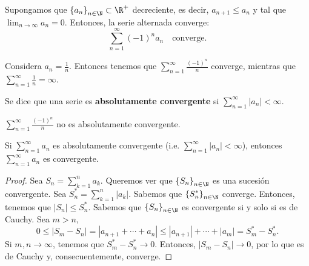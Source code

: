 \begin{ftheorem}
	\normalfont Supongamos que $\displaystyle \left\{ a_{n}\right\} _{n\in\N}\subset\R^{+} $ decreciente, es decir, $\displaystyle a_{n+1} \leq a_{n} $ y tal que $\displaystyle \lim_{n \to \infty}a_{n} = 0 $. Entonces, la serie alternada converge:
	\[\sum^{\infty}_{n = 1}\left(-1\right)^{n}a_{n} \quad \text{converge}.\]
\end{ftheorem}

\begin{eg}
\normalfont Considera $\displaystyle a_{n} = \frac{1}{n} $. Entonces tenemos que $\displaystyle \sum^{\infty}_{n = 1} \frac{\left(-1\right)^{n}}{n} $ converge, mientras que $\displaystyle \sum^{\infty}_{n=1} \frac{1}{n} = \infty $.
\end{eg}

\begin{fdefinition}[]
\normalfont Se dice que una serie es \textbf{absolutamente convergente} si $\displaystyle \sum^{\infty}_{n = 1} \left|a_{n}\right| < \infty $.
\end{fdefinition}

\begin{observation}
\normalfont $\displaystyle \sum^{\infty}_{n = 1}\frac{\left(-1\right)^{n}}{n} $ no es absolutamente convergente.
\end{observation}

\begin{ftheorem}[]
\normalfont Si $\displaystyle \sum^{\infty}_{n = 1}a_{n} $ es absolutamente convergente (i.e. $\displaystyle \sum^{\infty}_{n = 1} \left|a_{n}\right| < \infty $), entonces $\displaystyle \sum^{\infty}_{n = 1}a_{n} $ es convergente.
\end{ftheorem}

\begin{proof}
	Sea $\displaystyle S_{n} = \sum^{n}_{k=1}a_{k} $. Queremos ver que $\displaystyle \left\{ S_{n}\right\} _{n\in\N} $ es una sucesión convergente. Sea $\displaystyle S^{*}_{n} = \sum^{n}_{k=1} \left|a_{k}\right| $. Sabemos que $\displaystyle \left\{ S^{*}_{n}\right\} _{n\in\N} $ converge. Entonces, tenemos que $\displaystyle \left|S_{n}\right| \leq S^{*}_{n} $. Sabemos que $\displaystyle \left\{ S_{n}\right\} _{n\in\N} $ es convergente si y solo si es de Cauchy. Sea $\displaystyle m > n $, 
	\[0\leq |S_{m} - S_{n} | = |a_{n+1}+ \cdots + a_{n}| \leq \left|a_{n+1}\right| + \cdots + \left|a_{m}\right| = S^{*}_{m}-S^{*}_{n}.\]
Si $\displaystyle m,n \to \infty $, tenemos que $\displaystyle S^{*}_{m} - S^{*}_{n} \to 0 $. Entonces, $\displaystyle \left|S_{m}-S_{n}\right| \to 0 $, por lo que es de Cauchy y, consecuentemente, converge. 
\end{proof}

